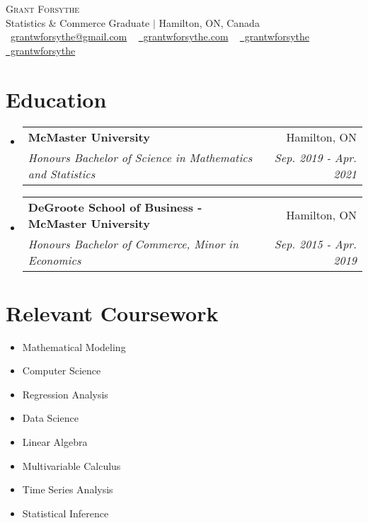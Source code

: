 \documentclass[letterpaper,11pt]{article}
\makeatletter
\newcommand{\resumeSubheading}[4]{
  \vspace{-2pt}\item
    \begin{tabular*}{1.0\textwidth}[t]{l@{\extracolsep{\fill}}r}
      \textbf{#1} & #2 \\
      \textit{\small#3} & \textit{\small #4} \\
    \end{tabular*}\vspace{-7pt}
}
\newcommand{\resumeSubHeadingListStart}{\begin{itemize}[leftmargin=0.0in, label={}]}
\newcommand{\resumeSubHeadingListEnd}{\end{itemize}}
\makeatother
\begin{document}
\begin{center}
    {\Huge \scshape Grant Forsythe} \\ \vspace{1pt}
    Statistics \& Commerce Graduate $\vert$ Hamilton, ON, Canada \\ \vspace{1pt}
    \small \raisebox{-0.1\height}\faAt\ \href{mailto:grantwforsythe@gmail.com}{grantwforsythe@gmail.com} ~ \href{https://www.grantwforsythe.com}{\raisebox{-0.2\height}\faGlobe\  grantwforsythe.com} ~ 
    \href{https://linkedin.com/in/grantwforsythe/}{\raisebox{-0.2\height}\faLinkedin\ grantwforsythe}  ~
    \href{https://github.com/grantwforsythe}{\raisebox{-0.2\height}\faGithub\ grantwforsythe}
    \vspace{-8pt}
\end{center}

\section{Education}
  \resumeSubHeadingListStart
    \resumeSubheading
      {McMaster University}{Hamilton, ON}
      {Honours Bachelor of Science in Mathematics and Statistics}{Sep. 2019 - Apr. 2021}
    \resumeSubheading
      {DeGroote School of Business - McMaster University}{Hamilton, ON}
      {Honours Bachelor of Commerce, Minor in Economics}{Sep. 2015 - Apr. 2019}
  \resumeSubHeadingListEnd
\vspace{-13pt} 

\section{Relevant Coursework}
        \begin{multicols}{4}
            \begin{itemize}[itemsep=-5pt, parsep=3pt]
                \item\small Mathematical Modeling
                \item Computer Science
                \item Regression Analysis
                \item Data Science
                \item Linear Algebra
                \item Multivariable Calculus
                \item Time Series Analysis
                \item Statistical Inference
            \end{itemize}
        \end{multicols}
        \vspace*{2.0\multicolsep}
\vspace{3pt}
\end{document}
